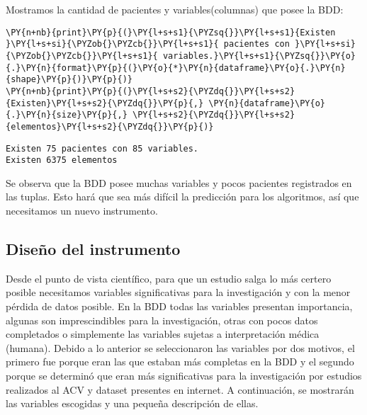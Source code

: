     Mostramos la cantidad de pacientes y variables(columnas) que posee la
BDD:

    \begin{tcolorbox}[breakable, size=fbox, boxrule=1pt, pad at break*=1mm,colback=cellbackground, colframe=cellborder]
\begin{Verbatim}[commandchars=\\\{\}]
\PY{n+nb}{print}\PY{p}{(}\PY{l+s+s1}{\PYZsq{}}\PY{l+s+s1}{Existen }\PY{l+s+si}{\PYZob{}\PYZcb{}}\PY{l+s+s1}{ pacientes con }\PY{l+s+si}{\PYZob{}\PYZcb{}}\PY{l+s+s1}{ variables.}\PY{l+s+s1}{\PYZsq{}}\PY{o}{.}\PY{n}{format}\PY{p}{(}\PY{o}{*}\PY{n}{dataframe}\PY{o}{.}\PY{n}{shape}\PY{p}{)}\PY{p}{)}
\PY{n+nb}{print}\PY{p}{(}\PY{l+s+s2}{\PYZdq{}}\PY{l+s+s2}{Existen}\PY{l+s+s2}{\PYZdq{}}\PY{p}{,} \PY{n}{dataframe}\PY{o}{.}\PY{n}{size}\PY{p}{,} \PY{l+s+s2}{\PYZdq{}}\PY{l+s+s2}{elementos}\PY{l+s+s2}{\PYZdq{}}\PY{p}{)}
\end{Verbatim}
\end{tcolorbox}

    \begin{Verbatim}[commandchars=\\\{\}]
Existen 75 pacientes con 85 variables.
Existen 6375 elementos
    \end{Verbatim}

    Se observa que la BDD posee muchas variables y pocos pacientes registrados en las tuplas. Esto hará que sea más difícil la predicción para los algoritmos, así que necesitamos un nuevo instrumento.

    \hypertarget{diseuxf1o-del-instrumento}{%
\subsection{Diseño del instrumento}\label{diseuxf1o-del-instrumento}}

Desde el punto de vista científico, para que un estudio salga lo más certero posible necesitamos variables significativas para la investigación y con la menor pérdida de datos posible. En la BDD todas las variables presentan importancia, algunas son imprescindibles para la investigación, otras con pocos datos completados o simplemente las variables sujetas a interpretación médica (humana). Debido a lo anterior se seleccionaron las variables por dos motivos, el primero fue porque eran las que estaban más completas en la BDD y el segundo porque se determinó que eran más significativas para la investigación por estudios realizados al ACV y dataset presentes en internet. A continuación, se mostrarán las variables escogidas y una pequeña descripción de ellas.

